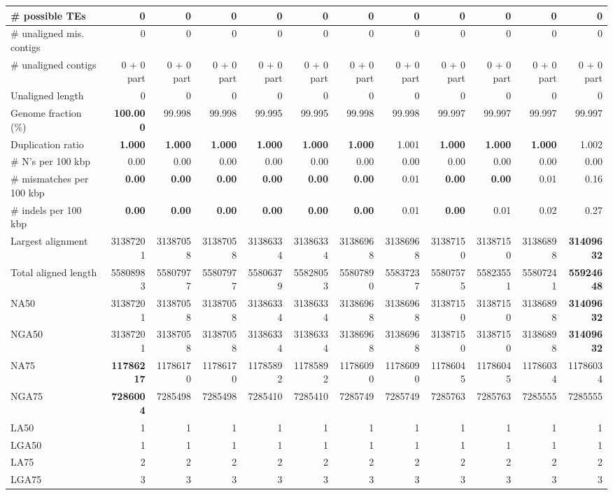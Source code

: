 \documentclass[12pt,a4paper]{article}
\begin{document}
\begin{table}[ht]
\begin{center}
\begin{tabular}{|l*{11}{|r}|}
\# possible TEs & 0 & 0 & 0 & 0 & 0 & 0 & 0 & 0 & 0 & 0 & 0 \\ \hline
\# unaligned mis. contigs & 0 & 0 & 0 & 0 & 0 & 0 & 0 & 0 & 0 & 0 & 0 \\ \hline
\# unaligned contigs & 0 + 0 part & 0 + 0 part & 0 + 0 part & 0 + 0 part & 0 + 0 part & 0 + 0 part & 0 + 0 part & 0 + 0 part & 0 + 0 part & 0 + 0 part & 0 + 0 part \\ \hline
Unaligned length & 0 & 0 & 0 & 0 & 0 & 0 & 0 & 0 & 0 & 0 & 0 \\ \hline
Genome fraction (\%) & {\bf 100.000} & 99.998 & 99.998 & 99.995 & 99.995 & 99.998 & 99.998 & 99.997 & 99.997 & 99.997 & 99.997 \\ \hline
Duplication ratio & {\bf 1.000} & {\bf 1.000} & {\bf 1.000} & {\bf 1.000} & {\bf 1.000} & {\bf 1.000} & 1.001 & {\bf 1.000} & {\bf 1.000} & {\bf 1.000} & 1.002 \\ \hline
\# N's per 100 kbp & 0.00 & 0.00 & 0.00 & 0.00 & 0.00 & 0.00 & 0.00 & 0.00 & 0.00 & 0.00 & 0.00 \\ \hline
\# mismatches per 100 kbp & {\bf 0.00} & {\bf 0.00} & {\bf 0.00} & {\bf 0.00} & {\bf 0.00} & {\bf 0.00} & 0.01 & {\bf 0.00} & {\bf 0.00} & 0.01 & 0.16 \\ \hline
\# indels per 100 kbp & {\bf 0.00} & {\bf 0.00} & {\bf 0.00} & {\bf 0.00} & {\bf 0.00} & {\bf 0.00} & 0.01 & {\bf 0.00} & 0.01 & 0.02 & 0.27 \\ \hline
Largest alignment & 31387201 & 31387058 & 31387058 & 31386334 & 31386334 & 31386968 & 31386968 & 31387150 & 31387150 & 31386898 & {\bf 31409632} \\ \hline
Total aligned length & 55808983 & 55807977 & 55807977 & 55806379 & 55828053 & 55807890 & 55837237 & 55807575 & 55823551 & 55807241 & {\bf 55924648} \\ \hline
NA50 & 31387201 & 31387058 & 31387058 & 31386334 & 31386334 & 31386968 & 31386968 & 31387150 & 31387150 & 31386898 & {\bf 31409632} \\ \hline
NGA50 & 31387201 & 31387058 & 31387058 & 31386334 & 31386334 & 31386968 & 31386968 & 31387150 & 31387150 & 31386898 & {\bf 31409632} \\ \hline
NA75 & {\bf 11786217} & 11786170 & 11786170 & 11785892 & 11785892 & 11786090 & 11786090 & 11786045 & 11786045 & 11786034 & 11786034 \\ \hline
NGA75 & {\bf 7286004} & 7285498 & 7285498 & 7285410 & 7285410 & 7285749 & 7285749 & 7285763 & 7285763 & 7285555 & 7285555 \\ \hline
LA50 & 1 & 1 & 1 & 1 & 1 & 1 & 1 & 1 & 1 & 1 & 1 \\ \hline
LGA50 & 1 & 1 & 1 & 1 & 1 & 1 & 1 & 1 & 1 & 1 & 1 \\ \hline
LA75 & 2 & 2 & 2 & 2 & 2 & 2 & 2 & 2 & 2 & 2 & 2 \\ \hline
LGA75 & 3 & 3 & 3 & 3 & 3 & 3 & 3 & 3 & 3 & 3 & 3 \\ \hline
\end{tabular}
\end{center}
\end{table}
\end{document}
